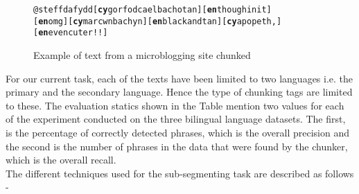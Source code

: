 \documentclass[11pt]{article}
\begin{document}
\begin{figure}
\begin{small}
\begin{alltt}
@steffdafydd [\textbf{cy} gorfod cael bach o tan] [\textbf{en} though init]
[\textbf{en} omg] [\textbf{cy} mar cwn bach yn] [\textbf{en} black and tan] [\textbf{cy} a popeth,] [\textbf{en} even cuter!!]
\end{alltt}
\end{small}
\label{fig:tweets}
\caption{Example of text from a microblogging site chunked}
\end{figure}

For our current task, each of the texts have been limited to two languages i.e. the primary and the secondary language. Hence the type of chunking tags are limited to these. The evaluation statics shown in the Table mention two values for each of the experiment conducted on the three bilingual language datasets. The first, is the percentage of correctly detected phrases, which is the overall precision and the second is the number of phrases in the data that were found by the chunker, which is the overall recall. \\

The different techniques used for the sub-segmenting task are described as follows - 
\end{document}

